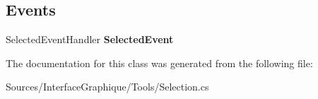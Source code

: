 \subsection*{Events}
\begin{DoxyCompactItemize}
\item 
\hypertarget{class_interface_graphique_1_1_tools_1_1_selection_a71b1b4a61b8380c2a788ed8cb816fd61}{}Selected\+Event\+Handler {\bfseries Selected\+Event}\label{class_interface_graphique_1_1_tools_1_1_selection_a71b1b4a61b8380c2a788ed8cb816fd61}

\end{DoxyCompactItemize}


The documentation for this class was generated from the following file\+:\begin{DoxyCompactItemize}
\item 
Sources/\+Interface\+Graphique/\+Tools/Selection.\+cs\end{DoxyCompactItemize}
